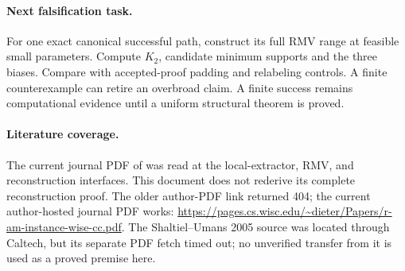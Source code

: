 \documentclass[11pt]{article}
\begin{document}
\paragraph{Next falsification task.}
For one exact canonical successful path, construct its full RMV range
at feasible small parameters. Compute $K_2$, candidate minimum supports
and the three biases. Compare with accepted-proof padding and relabeling
controls. A finite counterexample can retire an overbroad claim.
A finite success remains computational evidence until a uniform
structural theorem is proved.

\paragraph{Literature coverage.}
The current journal PDF of \cite{vms2025} was read at the local-extractor,
RMV, and reconstruction interfaces. This document does not rederive its
complete reconstruction proof. The older author-PDF link returned 404;
the current author-hosted journal PDF works:
\url{https://pages.cs.wisc.edu/~dieter/Papers/r-am-instance-wise-cc.pdf}.
The Shaltiel--Umans 2005 source was located through Caltech, but its
separate PDF fetch timed out; no unverified transfer from it is used
as a proved premise here.



\end{document}
